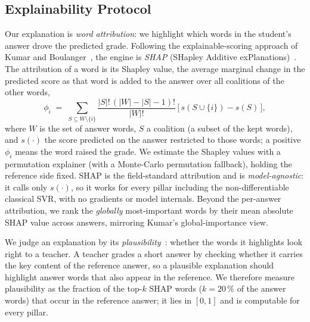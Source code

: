 \subsection{Explainability Protocol}
\label{sec:xai}
Our explanation is \emph{word attribution}: we highlight which words in the student's answer drove the
predicted grade. Following the explainable-scoring approach of Kumar and
Boulanger~\citep{kumar2020explainable}, the engine is \emph{SHAP} (SHapley Additive
exPlanations)~\citep{lundberg2017shap}. The attribution of a word is its Shapley value, the average
marginal change in the predicted score as that word is added to the answer over all coalitions of the
other words,
\begin{equation}
\phi_i \;=\; \sum_{S \subseteq W\setminus\{i\}} \frac{|S|!\,(|W|-|S|-1)!}{|W|!}\,
\big[\,s(S\cup\{i\}) - s(S)\,\big],
\end{equation}
where $W$ is the set of answer words, $S$ a coalition (a subset of the kept words), and $s(\cdot)$ the
score predicted on the answer restricted to those words; a positive $\phi_i$ means the word raised the
grade. We estimate the Shapley values with a permutation explainer (with a Monte-Carlo permutation
fallback), holding the reference side fixed. SHAP is the field-standard attribution and is
\emph{model-agnostic}: it calls only $s(\cdot)$, so it works for every pillar including the
non-differentiable classical SVR, with no gradients or model internals. Beyond the per-answer
attribution, we rank the \emph{globally} most-important words by their mean absolute SHAP value across
answers, mirroring Kumar's global-importance view.

We judge an explanation by its \emph{plausibility}~\citep{lyu2024faithfulsurvey}: whether the words it
highlights look right to a teacher. A teacher grades a short answer by checking whether it carries the
key content of the reference answer, so a plausible explanation should highlight answer words that also
appear in the reference. We therefore measure plausibility as the fraction of the top-$k$ SHAP words
($k=20\,\%$ of the answer words) that occur in the reference answer; it lies in $[0,1]$ and is
computable for every pillar.
